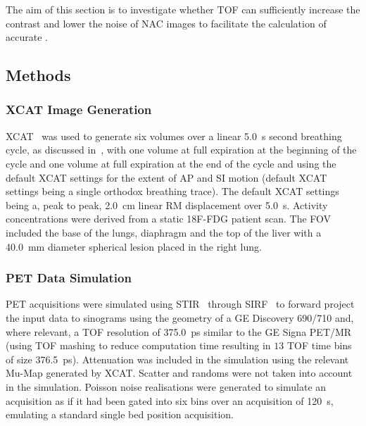         The aim of this section is to investigate whether \gls{TOF} can sufficiently increase the contrast and lower the noise of \gls{NAC} images to facilitate the calculation of accurate .
        
        \subsection{Methods} \label{sec:impact_of_tof_on_respiratory_motion_model_estimation_using_pre_gated_no_intra_cycle_motion_nac_pet_methods}
            \subsubsection{XCAT Image Generation} \label{sec:impact_of_tof_on_respiratory_motion_model_estimation_using_pre_gated_no_intra_cycle_motion_nac_pet_methods_xcat_image_generation}
                \gls{XCAT}~ was used to generate six volumes over a linear \SI{5.0}{\second} second breathing cycle, as discussed in~, with one volume at full expiration at the beginning of the cycle and one volume at full expiration at the end of the cycle and using the default \gls{XCAT} settings for the extent of \gls{AP} and \gls{SI} motion (default \gls{XCAT} settings being a single orthodox breathing trace). The default \gls{XCAT} settings being a, peak to peak, \SI{2.0}{\centi\metre} linear \gls{RM} displacement over \SI{5.0}{\second}. Activity concentrations were derived from a static \gls{18F-FDG} patient scan. The \gls{FOV} included the base of the lungs, diaphragm and the top of the liver with a \SI{40.0}{\milli\metre} diameter spherical lesion placed in the right lung.
            
            \subsubsection{PET Data Simulation} \label{sec:impact_of_tof_on_respiratory_motion_model_estimation_using_pre_gated_no_intra_cycle_motion_nac_pet_methods_pet_data_simulation}
                \gls{PET} acquisitions were simulated using \gls{STIR}~ through \gls{SIRF}~ to forward project the input data to sinograms using the geometry of a \gls{GE} Discovery 690/710 and, where relevant, a \gls{TOF} resolution of \SI{375.0}{\pico\second} similar to the \gls{GE} Signa \gls{PET}/\gls{MR} (using \gls{TOF} mashing to reduce computation time resulting in $13$ \gls{TOF} time bins of size \SI{376.5}{\pico\second}). Attenuation was included in the simulation using the relevant \gls{Mu-Map} generated by \gls{XCAT}. Scatter and randoms were not taken into account in the simulation. Poisson noise realisations were generated to simulate an acquisition as if it had been gated into six bins over an acquisition of \SI{120}{\second}, emulating a standard single bed position acquisition. 
            
